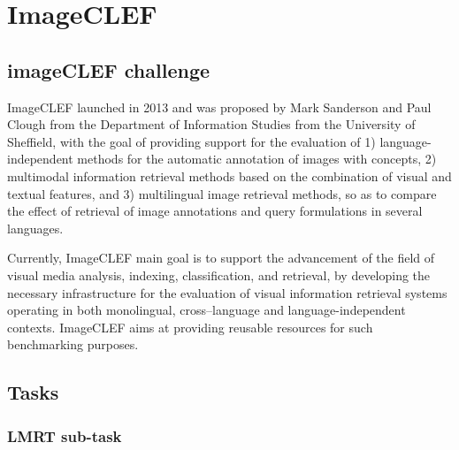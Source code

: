 \cleardoublepage

\chapter{ImageCLEF}
\label{ch:imageclef}





\section{imageCLEF challenge}

ImageCLEF launched in 2013 and was proposed by Mark Sanderson and Paul Clough from the Department of Information Studies from the University of Sheffield, with the goal of providing support for the evaluation of 1) language-independent methods for the automatic annotation of images with concepts, 2) multimodal information retrieval methods based on the combination of visual and textual features, and 3) multilingual image retrieval methods, so as to compare the effect of retrieval of image annotations and query formulations in several languages.

Currently, ImageCLEF main goal is to support the advancement of the field of visual media analysis, indexing, classification, and retrieval, by developing the necessary infrastructure for the evaluation of visual information retrieval systems operating in both monolingual, cross–language and language-independent contexts. ImageCLEF aims at providing reusable resources for such benchmarking purposes.



\section{Tasks}
    \subsection{LMRT sub-task}






    
